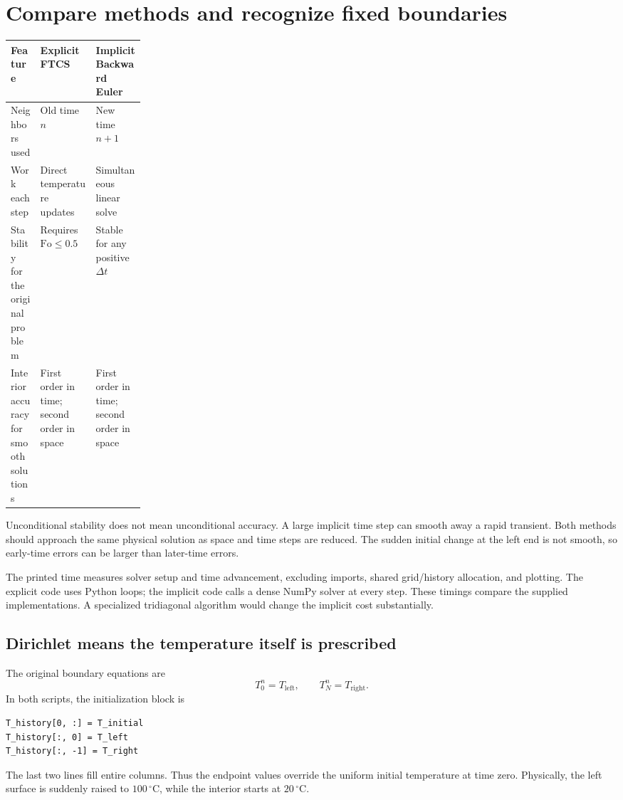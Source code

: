 \documentclass[11pt,letterpaper]{article}
\newcommand{\Fo}{\mathrm{Fo}}
\begin{document}
\section{Compare methods and recognize fixed boundaries}
\begin{center}
\small
\begin{tabularx}{\linewidth}{@{}P{0.22\linewidth}Y Y@{}}
\toprule
\textbf{Feature} & \textbf{Explicit FTCS} & \textbf{Implicit Backward Euler} \\
\midrule
Neighbors used & Old time $n$ & New time $n+1$ \\
Work each step & Direct temperature updates & Simultaneous linear solve \\
Stability for the original problem & Requires $\Fo\le0.5$ & Stable for any positive $\Delta t$ \\
Interior accuracy for smooth solutions & First order in time; second order in space & First order in time; second order in space \\
\bottomrule
\end{tabularx}
\end{center}
Unconditional stability does not mean unconditional accuracy. A large
implicit time step can smooth away a rapid transient. Both methods should
approach the same physical solution as space and time steps are reduced.
The sudden initial change at the left end is not smooth, so early-time
errors can be larger than later-time errors.


The printed time measures solver setup and time advancement, excluding
imports, shared grid/history allocation, and plotting. The explicit code
uses Python loops; the implicit code calls a dense NumPy solver at every
step. These timings compare the supplied implementations. A specialized
tridiagonal algorithm would change the implicit cost substantially.


\subsection*{Dirichlet means the temperature itself is prescribed}
The original boundary equations are
\[
 T_0^n=T_{\mathrm{left}},\qquad T_N^n=T_{\mathrm{right}}.
\]
In both scripts, the initialization block is
\begin{lstlisting}
T_history[0, :] = T_initial
T_history[:, 0] = T_left
T_history[:, -1] = T_right
\end{lstlisting}
The last two lines fill entire columns. Thus the endpoint values override
the uniform initial temperature at time zero. Physically, the left surface
is suddenly raised to $100\,^{\circ}\mathrm C$, while the interior starts
at $20\,^{\circ}\mathrm C$.
\end{document}
